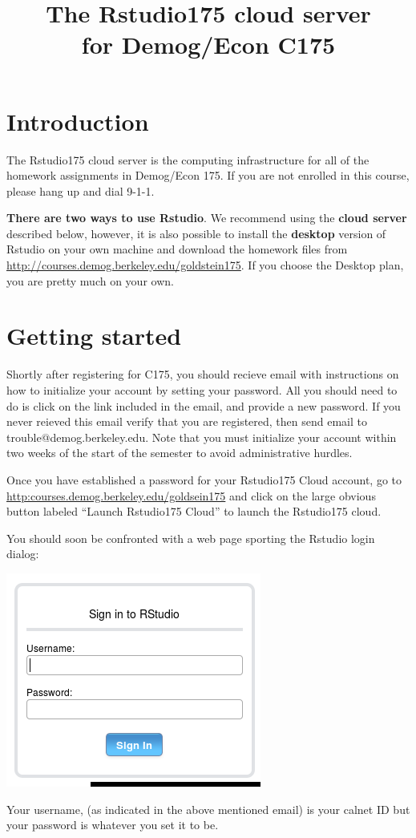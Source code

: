\message{ !name(index.tex)}\documentclass[11pt]{article}
\begin{document}


\title{The Rstudio175 cloud server\\
for Demog/Econ C175}

\maketitle
\tableofcontents

\section{Introduction}

The Rstudio175 cloud server is the computing infrastructure for all of the homework assignments in Demog/Econ 175. If you are not enrolled in this course, please hang up and dial 9-1-1.
\begin{mdframed}[backgroundcolor=blue!20]        
\textbf{There are two ways to use Rstudio}. We recommend using the \textbf{cloud server} described below, however, it is also possible to install the \textbf{desktop} version of  Rstudio on your own machine and download the homework files from \url{http://courses.demog.berkeley.edu/goldstein175}. If you choose the Desktop plan, you are pretty much on your own.
\end{mdframed}
\section{Getting started}

Shortly after registering for C175, you should recieve email with instructions on how to initialize your account by setting your password.  All you should need to do is click on the link included in the email, and provide a new password.  If you never reieved this email verify that you are registered, then send email to trouble@demog.berkeley.edu.  Note that you must initialize your account within two weeks of the start of the semester to avoid administrative hurdles.

Once you have established a password for your Rstudio175 Cloud account, go to 
\url{http:courses.demog.berkeley.edu/goldsein175} and click on the large obvious button labeled ``Launch Rstudio175 Cloud'' to launch the Rstudio175 cloud.

You should soon be confronted with a web page sporting the Rstudio login dialog:

\includegraphics[scale=.35]{RstudioSignin}

Your username, (as indicated in the above mentioned email) is your calnet ID but your
password is whatever you set it to be.  
\end{document}
